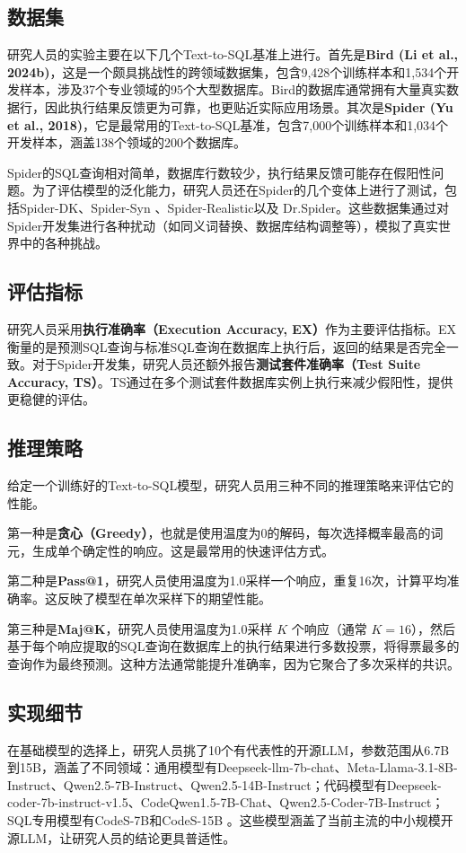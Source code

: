 \subsection{数据集}
研究人员的实验主要在以下几个Text-to-SQL基准上进行。首先是\textbf{Bird (Li et al., 2024b)}，这是一个颇具挑战性的跨领域数据集，包含9,428个训练样本和1,534个开发样本，涉及37个专业领域的95个大型数据库。Bird的数据库通常拥有大量真实数据行，因此执行结果反馈更为可靠，也更贴近实际应用场景。其次是\textbf{Spider (Yu et al., 2018)}，它是最常用的Text-to-SQL基准，包含7,000个训练样本和1,034个开发样本，涵盖138个领域的200个数据库。

Spider的SQL查询相对简单，数据库行数较少，执行结果反馈可能存在假阳性问题。为了评估模型的泛化能力，研究人员还在Spider的几个变体上进行了测试，包括Spider-DK、Spider-Syn 、Spider-Realistic以及 Dr.Spider。这些数据集通过对Spider开发集进行各种扰动（如同义词替换、数据库结构调整等），模拟了真实世界中的各种挑战。

\subsection{评估指标}
研究人员采用\textbf{执行准确率（Execution Accuracy, EX）}作为主要评估指标。EX衡量的是预测SQL查询与标准SQL查询在数据库上执行后，返回的结果是否完全一致。对于Spider开发集，研究人员还额外报告\textbf{测试套件准确率（Test Suite Accuracy, TS）}。TS通过在多个测试套件数据库实例上执行来减少假阳性，提供更稳健的评估。

\subsection{推理策略}
给定一个训练好的Text-to-SQL模型，研究人员用三种不同的推理策略来评估它的性能。

第一种是\textbf{贪心（Greedy）}，也就是使用温度为0的解码，每次选择概率最高的词元，生成单个确定性的响应。这是最常用的快速评估方式。

第二种是\textbf{Pass@1}，研究人员使用温度为1.0采样一个响应，重复16次，计算平均准确率。这反映了模型在单次采样下的期望性能。

第三种是\textbf{Maj@K}，研究人员使用温度为1.0采样 \(K\) 个响应（通常 \(K=16\)），然后基于每个响应提取的SQL查询在数据库上的执行结果进行多数投票，将得票最多的查询作为最终预测。这种方法通常能提升准确率，因为它聚合了多次采样的共识。

\subsection{实现细节}
在基础模型的选择上，研究人员挑了10个有代表性的开源LLM，参数范围从6.7B到15B，涵盖了不同领域：通用模型有Deepseek-llm-7b-chat、Meta-Llama-3.1-8B-Instruct、Qwen2.5-7B-Instruct、Qwen2.5-14B-Instruct；代码模型有Deepseek-coder-7b-instruct-v1.5、CodeQwen1.5-7B-Chat、Qwen2.5-Coder-7B-Instruct；SQL专用模型有CodeS-7B和CodeS-15B 。这些模型涵盖了当前主流的中小规模开源LLM，让研究人员的结论更具普适性。

